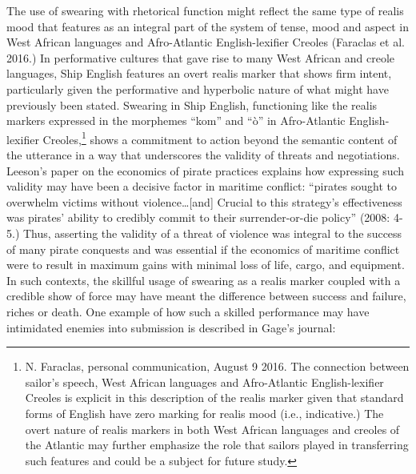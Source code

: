\begin{styleStandard}
The use of swearing with rhetorical function might reflect the same type of realis mood that features as an integral part of the system of tense, mood and aspect in West African languages and Afro-Atlantic English-lexifier Creoles (Faraclas et al. 2016.) In performative cultures that gave rise to many West African and creole languages, Ship English features an overt realis marker that shows firm intent, particularly given the performative and hyperbolic nature of what might have previously been stated. Swearing in Ship English, functioning like the realis markers expressed in the morphemes “kom” and “ò” in Afro-Atlantic English-lexifier Creoles,\footnote{ N. Faraclas, personal communication, August 9 2016. The connection between sailor’s speech, West African languages and Afro-Atlantic English-lexifier Creoles is explicit in this description of the realis marker given that standard forms of English have zero marking for realis mood (i.e., indicative.) The overt nature of realis markers in both West African languages and creoles of the Atlantic may further emphasize the role that sailors played in transferring such features and could be a subject for future study.} shows a commitment to action beyond the semantic content of the utterance in a way that underscores the validity of threats and negotiations. Leeson’s paper on the economics of pirate practices explains how expressing such validity may have been a decisive factor in maritime conflict: “pirates sought to overwhelm victims without violence…[and] Crucial to this strategy’s effectiveness was pirates’ ability to credibly commit to their surrender-or-die policy” (2008: 4-5.) Thus, asserting the validity of a threat of violence was integral to the success of many pirate conquests and was essential if the economics of maritime conflict were to result in maximum gains with minimal loss of life, cargo, and equipment. In such contexts, the skillful usage of swearing as a realis marker coupled with a credible show of force may have meant the difference between success and failure, riches or death. One example of how such a skilled performance may have intimidated enemies into submission is described in Gage’s journal:
\end{styleStandard}


